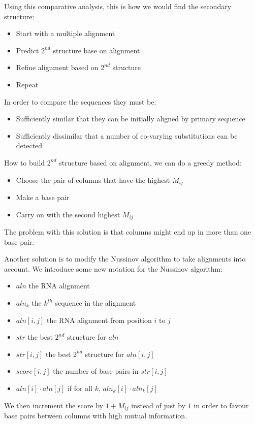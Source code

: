     Using this comparative analysis, this is how we would find the secondary 
    structure:
    \begin{itemize}
        \item Start with a multiple alignment
        \item Predict $2^{nd}$ structure base on alignment
        \item Refine alignment based on $2^{nd}$ structure
        \item Repeat
    \end{itemize}
    
    In order to compare the sequences they must be:
    \begin{itemize}
        \item Sufficiently similar that they can be initially aligned by 
        primary sequence
        \item Sufficiently dissimilar that a number of co-varying substitutions 
        can be detected
    \end{itemize}
    
    How to build $2^{nd}$ structure based on alignment, we can do a greedy 
    method:
    \begin{itemize}
        \item Choose the pair of columns that have the highest $M_{ij}$
        \item Make a base pair
        \item Carry on with the second highest $M_{ij}$
    \end{itemize}
    The problem with this solution is that columns might end up in more than 
    one base pair.
    
    Another solution is to modify the Nussinov algorithm to take alignments 
    into account. We introduce some new notation for the Nussinov algorithm:
    \begin{itemize}
        \item $aln$ the RNA alignment
        \item $aln_k$ the $k^{th}$ sequence in the alignment
        \item $aln[i,j]$ the RNA alignment from position $i$ to $j$
        \item $str$ the best $2^{nd}$ structure for $aln$
        \item $str[i,j]$ the best $2^{nd}$ structure for $aln[i,j]$
        \item $score[i,j]$ the number of base pairs in $str[i,j]$
        \item $aln[i] \cdot aln[j]$ if for all $k$, $aln_k[i]\cdot aln_k[j]$
    \end{itemize}
    We then increment the score by $1+M_{ij}$ instead of just by $1$ in order 
    to favour base pairs between columns with high mutual information.
    
